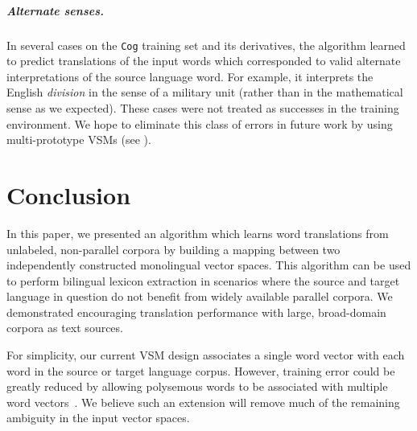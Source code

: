 \documentclass[11pt]{article}
\begin{document}
\subparagraph{Alternate senses.} In several cases on the \texttt{Cog} training
set and its derivatives, the algorithm learned to predict translations of the
input words which corresponded to valid alternate interpretations of the source
language word. For example, it interprets the English \textit{division} in the
sense of a military unit (rather than in the mathematical sense as we expected).
These cases were not treated as successes in the  training
environment. We hope to eliminate this class of errors in future work by using
multi-prototype VSMs (see ).


\section{Conclusion}
\label{sec:conclusion}

In this paper, we presented an algorithm which learns word translations from
unlabeled, non-parallel corpora by building a mapping between two independently
constructed monolingual vector spaces. This algorithm can be used to perform
bilingual lexicon extraction in scenarios where the source and target language
in question do not benefit from widely available parallel corpora. We
demonstrated encouraging translation performance with large, broad-domain
corpora as text sources.

For simplicity, our current VSM design associates a single word vector with each
word in the source or target language corpus. However, training error could be
greatly reduced by allowing polysemous words to be associated with multiple word
vectors~\cite{reisinger2010,huang2012}. We believe such an extension will remove
much of the remaining ambiguity in the input vector spaces.




\end{document}
